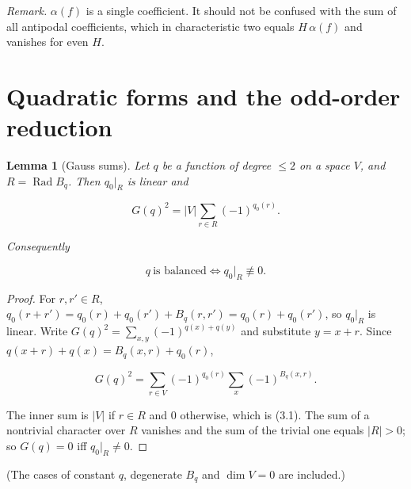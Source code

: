 \documentclass[11pt,reqno]{amsart}
\newtheorem{lemma}{Lemma}[section]
\begin{document}
\emph{Remark.} $\alpha(f)$ is a single coefficient. It should not be confused with the sum of all antipodal coefficients, which in characteristic two equals $H\,\alpha(f)$ and vanishes for even $H$.


\section{Quadratic forms and the odd-order reduction}

\begin{lemma}[Gauss sums]
Let $q$ be a function of degree $\le2$ on a space $V$, and $R=\operatorname{Rad}B_q$. Then $q_0|_R$ is linear and

\begin{equation*}G(q)^2=|V|\sum_{r\in R}(-1)^{q_0(r)}. \tag{3.1}\end{equation*}

Consequently

\begin{equation*}q\ \text{is balanced}\iff q_0|_R\not\equiv0. \tag{3.2}\end{equation*}


\end{lemma}
\begin{proof}
For $r,r'\in R$, $q_0(r+r')=q_0(r)+q_0(r')+B_q(r,r')=q_0(r)+q_0(r')$, so $q_0|_R$ is linear. Write $G(q)^2=\sum_{x,y}(-1)^{q(x)+q(y)}$ and substitute $y=x+r$. Since $q(x+r)+q(x)=B_q(x,r)+q_0(r)$,

\begin{equation*}G(q)^2=\sum_{r\in V}(-1)^{q_0(r)}\sum_{x}(-1)^{B_q(x,r)}.\end{equation*}

The inner sum is $|V|$ if $r\in R$ and $0$ otherwise, which is (3.1). The sum of a nontrivial character over $R$ vanishes and the sum of the trivial one equals $|R|>0$; so $G(q)=0$ iff $q_0|_R\ne0$.
\end{proof}

(The cases of constant $q$, degenerate $B_q$ and $\dim V=0$ are included.)
\end{document}
